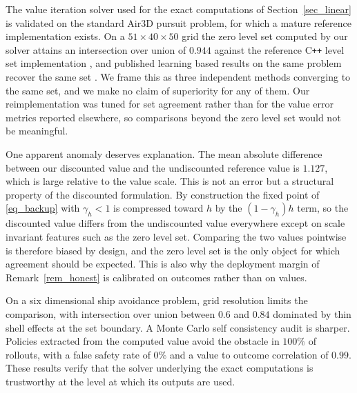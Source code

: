 \documentclass[journal]{IEEEtran}
\begin{document}
The value iteration solver used for the exact computations of Section~\ref{sec_linear} is validated on the standard Air3D pursuit problem, for which a mature reference implementation exists. On a $51 \times 40 \times 50$ grid the zero level set computed by our solver attains an intersection over union of $0.944$ against the reference C\texttt{++} level set implementation \cite{mitchell2005}, and published learning based results on the same problem recover the same set \cite{bansal2021deepreach}. We frame this as three independent methods converging to the same set, and we make no claim of superiority for any of them. Our reimplementation was tuned for set agreement rather than for the value error metrics reported elsewhere, so comparisons beyond the zero level set would not be meaningful.

One apparent anomaly deserves explanation. The mean absolute difference between our discounted value and the undiscounted reference value is $1.127$, which is large relative to the value scale. This is not an error but a structural property of the discounted formulation. By construction the fixed point of \eqref{eq_backup} with $\gamma_h < 1$ is compressed toward $h$ by the $(1-\gamma_h)h$ term, so the discounted value differs from the undiscounted value everywhere except on scale invariant features such as the zero level set. Comparing the two values pointwise is therefore biased by design, and the zero level set is the only object for which agreement should be expected. This is also why the deployment margin of Remark~\ref{rem_honest} is calibrated on outcomes rather than on values.

On a six dimensional ship avoidance problem, grid resolution limits the comparison, with intersection over union between $0.6$ and $0.84$ dominated by thin shell effects at the set boundary. A Monte Carlo self consistency audit is sharper. Policies extracted from the computed value avoid the obstacle in $100\%$ of rollouts, with a false safety rate of $0\%$ and a value to outcome correlation of $0.99$. These results verify that the solver underlying the exact computations is trustworthy at the level at which its outputs are used.



\end{document}
